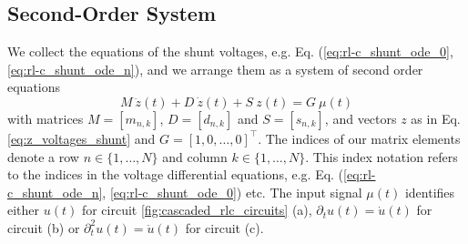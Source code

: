 	\subsection{Second-Order System}

We collect the equations of the shunt voltages, e.g. Eq.  (\ref{eq:rl-c_shunt_ode_0}, \ref{eq:rl-c_shunt_ode_n}), and we arrange them as a system of second order equations
\begin{equation}
	M~ \ddot{z}(t) + D~ \dot{z}(t) + S~ z(t) = G ~ \mu(t)
	\label{eq:rlc_second_order_1}
\end{equation}
with matrices $M = \left[ m_{n,k} \right]$, $D = \left[ d_{n,k} \right]$ and  $S = \left[ s_{n,k} \right]$, and vectors $z$ as in Eq. \eqref{eq:z_voltages_shunt} and  $G = [1, 0, \ldots, 0]^{\top}$. The indices of our matrix elements denote a row $n\in \{1,\ldots,N\}$ and column $k\in \{1,\ldots,N\}$. This index notation refers to the indices in the voltage differential equations, e.g. Eq. (\ref{eq:rl-c_shunt_ode_n}, \ref{eq:rl-c_shunt_ode_0}) etc. The input signal $\mu(t)$ identifies either $u(t)$ for circuit \ref{fig:cascaded_rlc_circuits} (a), $\partial_{t} u(t) = \dot{u}(t)$  for circuit (b) or  $\partial_{t}^2 u(t) = \ddot{u}(t)$ for circuit (c).

